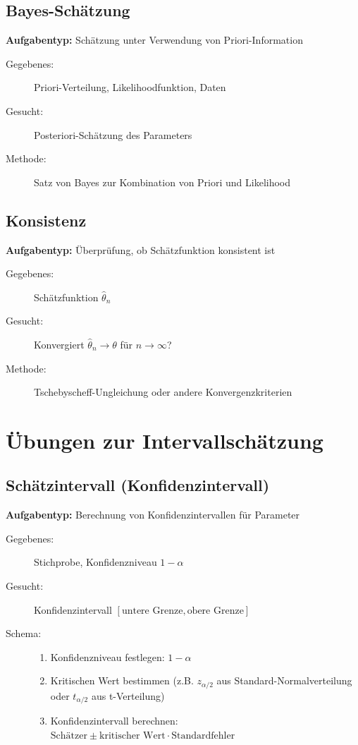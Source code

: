 \documentclass[12pt, a4paper, titlepage, ngerman]{scrartcl}
\begin{document}
\subsection{Bayes-Schätzung}

\textbf{Aufgabentyp:} Schätzung unter Verwendung von Priori-Information

\begin{description}
  \item[Gegebenes:] Priori-Verteilung, Likelihoodfunktion, Daten
  \item[Gesucht:] Posteriori-Schätzung des Parameters
  \item[Methode:] Satz von Bayes zur Kombination von Priori und Likelihood
\end{description}

\subsection{Konsistenz}

\textbf{Aufgabentyp:} Überprüfung, ob Schätzfunktion konsistent ist

\begin{description}
  \item[Gegebenes:] Schätzfunktion $\hat{\theta}_n$
  \item[Gesucht:] Konvergiert $\hat{\theta}_n \to \theta$ für $n \to \infty$?
  \item[Methode:] Tschebyscheff-Ungleichung oder andere Konvergenzkriterien
\end{description}

\section{Übungen zur Intervallschätzung}

\subsection{Schätzintervall (Konfidenzintervall)}

\textbf{Aufgabentyp:} Berechnung von Konfidenzintervallen für Parameter

\begin{description}
  \item[Gegebenes:] Stichprobe, Konfidenzniveau $1 - \alpha$
  \item[Gesucht:] Konfidenzintervall $[\text{untere Grenze}, \text{obere Grenze}]$
  \item[Schema:] 
    \begin{enumerate}
      \item Konfidenzniveau festlegen: $1 - \alpha$
      \item Kritischen Wert bestimmen (z.B. $z_{\alpha/2}$ aus Standard-Normalverteilung oder $t_{\alpha/2}$ aus t-Verteilung)
      \item Konfidenzintervall berechnen: $\text{Schätzer} \pm \text{kritischer Wert} \cdot \text{Standardfehler}$
    \end{enumerate}
\end{description}
\end{document}
